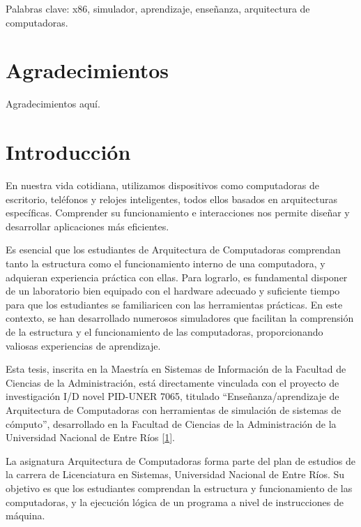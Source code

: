 \documentclass[12pt,twoside]{templates/unerthesis}
\begin{document}
Palabras clave: x86, simulador, aprendizaje, enseñanza, arquitectura de computadoras.

\hypertarget{agradecimientos}{%
\chapter*{Agradecimientos}\label{agradecimientos}}

Agradecimientos aquí.

\hypertarget{introducciuxf3n}{%
\chapter{Introducción}\label{introducciuxf3n}}

En nuestra vida cotidiana, utilizamos dispositivos como computadoras de escritorio, teléfonos y relojes inteligentes, todos ellos basados en arquitecturas específicas. Comprender su funcionamiento e interacciones nos permite diseñar y desarrollar aplicaciones más eficientes.

Es esencial que los estudiantes de Arquitectura de Computadoras comprendan tanto la estructura como el funcionamiento interno de una computadora, y adquieran experiencia práctica con ellas. Para lograrlo, es fundamental disponer de un laboratorio bien equipado con el hardware adecuado y suficiente tiempo para que los estudiantes se familiaricen con las herramientas prácticas. En este contexto, se han desarrollado numerosos simuladores que facilitan la comprensión de la estructura y el funcionamiento de las computadoras, proporcionando valiosas experiencias de aprendizaje.

Esta tesis, inscrita en la Maestría en Sistemas de Información de la Facultad de Ciencias de la Administración, está directamente vinculada con el proyecto de investigación I/D novel PID-UNER 7065, titulado ``Enseñanza/aprendizaje de Arquitectura de Computadoras con herramientas de simulación de sistemas de cómputo'', desarrollado en la Facultad de Ciencias de la Administración de la Universidad Nacional de Entre Ríos {[}\protect\hyperlink{ref-colombani_pid_2022}{1}{]}.

La asignatura Arquitectura de Computadoras forma parte del plan de estudios de la carrera de Licenciatura en Sistemas, Universidad Nacional de Entre Ríos. Su objetivo es que los estudiantes comprendan la estructura y funcionamiento de las computadoras, y la ejecución lógica de un programa a nivel de instrucciones de máquina.
\end{document}
